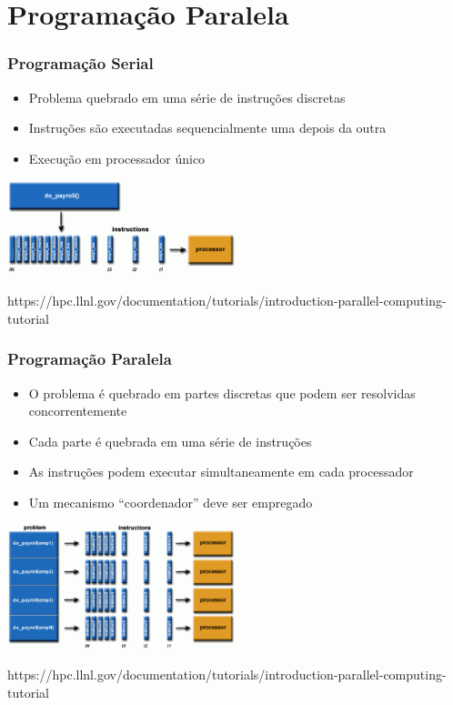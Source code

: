 \documentclass[xcolor={usenames,dvipsnames},12pt,presentation,aspectratio=169]{beamer}
\begin{document}
\section{Programação Paralela}
\begin{frame}
  \frametitle{Programação Serial}
  \vspace{-4mm}
  \begin{itemize}
    \item Problema quebrado em uma série de instruções discretas
    \item Instruções são executadas sequencialmente uma depois da outra
    \item Execução em processador único
  \end{itemize}
  \begin{center}
	\includegraphics[width=0.5\textwidth]{serialProblem2.png}
  \end{center}
  \vfill
  {\tiny https://hpc.llnl.gov/documentation/tutorials/introduction-parallel-computing-tutorial}
\end{frame}
\begin{frame}
  \frametitle{Programação Paralela}
  \vspace{-2mm}
  \begin{itemize}
    \item O problema é quebrado em partes discretas que podem ser resolvidas concorrentemente
    \item Cada parte é quebrada em uma série de instruções
    \item As instruções podem executar simultaneamente em cada processador
    \item Um mecanismo ``coordenador'' deve ser empregado
  \end{itemize}
  \begin{center}
	\includegraphics[width=0.5\textwidth]{parallelProblem2.png}
  \end{center}
  \vfill
  {\tiny https://hpc.llnl.gov/documentation/tutorials/introduction-parallel-computing-tutorial}
\end{frame}
\end{document}
